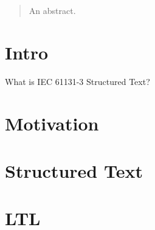\begin{abstract}

An abstract.

\end{abstract}

\section{Intro}

What is IEC 61131-3 Structured Text?

\section{Motivation}

\section{Structured Text}

\section{LTL}
